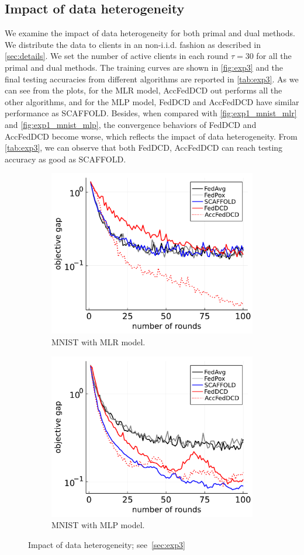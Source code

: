 \subsection{Impact of data heterogeneity} \label{sec:exp3}
We examine the impact of data heterogeneity for both primal and dual methods. We distribute the data to clients in an non-i.i.d. fashion as described in \autoref{sec:details}. We set the number of active clients in each round $\tau = 30$ for all the primal and dual methods. The training curves are shown in \autoref{fig:exp3} and the final testing accuracies from different algorithms are reported in \autoref{tab:exp3}.
As we can see from the plots, for the MLR model, AccFedDCD out performs all the other algorithms, and for the MLP model, FedDCD and AccFedDCD have similar performance as SCAFFOLD. Besides, when compared with \autoref{fig:exp1_mnist_mlr} and \autoref{fig:exp1_mnist_mlp}, the convergence behaviors of FedDCD and AccFedDCD become worse, which reflects the impact of data heterogeneity. From \autoref{tab:exp3}, we can observe that both FedDCD, AccFedDCD can reach testing accuracy as good as SCAFFOLD.

\begin{figure}[t]
\begin{subfigure}{.5\textwidth}
  \centering
  \includegraphics[width=.65\linewidth]{./figures/exp3_mnist_mlr.pdf}
  \caption{MNIST with MLR model.}
  \label{fig:exp3_mnist_mlr}
\end{subfigure}%
\begin{subfigure}{.5\textwidth}
  \centering
  \includegraphics[width=.65\linewidth]{./figures/exp3_mnist_mlp.pdf}
  \caption{MNIST with MLP model.}
  \label{fig:exp3_mnist_mlp}
\end{subfigure}
\caption{Impact of data heterogeneity; see~\autoref{sec:exp3}} 
\label{fig:exp3}
\end{figure}

